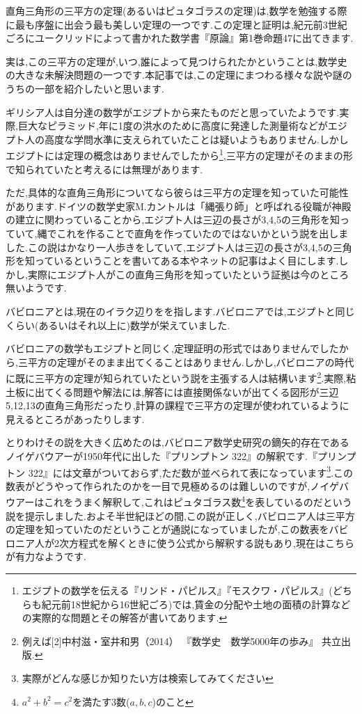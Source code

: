 \documentclass[./main]{subfiles}
\begin{document}

直角三角形の三平方の定理(あるいはピュタゴラスの定理)は,数学を勉強する際に最も序盤に出会う最も美しい定理の一つです.この定理と証明は,紀元前3世紀ごろにユークリッドによって書かれた数学書『原論』第1巻命題47に出てきます.

実は,この三平方の定理が,いつ,誰によって見つけられたかということは,数学史の大きな未解決問題の一つです.本記事では,この定理にまつわる様々な説や謎のうちの一部を紹介したいと思います.

ギリシア人は自分達の数学がエジプトから来たものだと思っていたようです.実際,巨大なピラミッド,年に1度の洪水のために高度に発達した測量術などがエジプト人の高度な学問水準に支えられていたことは疑いようもありません.しかしエジプトには定理の概念はありませんでしたから\footnote{エジプトの数学を伝える『リンド・パピルス』『モスクワ・パピルス』(どちらも紀元前18世紀から16世紀ごろ)では,賃金の分配や土地の面積の計算などの実際的な問題とその解答が書いてあります.},三平方の定理がそのままの形で知られていたと考えるには無理があります.

ただ,具体的な直角三角形についてなら彼らは三平方の定理を知っていた可能性があります.ドイツの数学史家M.カントルは「縄張り師」と呼ばれる役職が神殿の建立に関わっていることから,エジプト人は三辺の長さが3,4,5の三角形を知っていて,縄でこれを作ることで直角を作っていたのではないかという説を出しました.この説はかなり一人歩きをしていて,エジプト人は三辺の長さが3,4,5の三角形を知っているということを書いてある本やネットの記事はよく目にします.しかし,実際にエジプト人がこの直角三角形を知っていたという証拠は今のところ無いようです.


バビロニアとは,現在のイラク辺りをを指します.バビロニアでは,エジプトと同じくらい(あるいはそれ以上に)数学が栄えていました.

バビロニアの数学もエジプトと同じく,定理証明の形式ではありませんでしたから,三平方の定理がそのまま出てくることはありません.しかし,バビロニアの時代に既に三平方の定理が知られていたという説を主張する人は結構います\footnote{例えば[2]中村滋・室井和男（2014） 『数学史　数学5000年の歩み』 共立出版.}.実際,粘土板に出てくる問題や解法には,解答には直接関係ないが出てくる図形が三辺5,12,13の直角三角形だったり,計算の課程で三平方の定理が使われているように見えるところがあったりします.

とりわけその説を大きく広めたのは,バビロニア数学史研究の鏑矢的存在であるノイゲバウアーが1950年代に出した『プリンプトン 322』の解釈です.『プリンプトン 322』には文章がついておらず,ただ数が並べられて表になっています\footnote{実際がどんな感じか知りたい方は検索してみてください}.この数表がどうやって作られたのかを一目で見極めるのは難しいのですが,ノイゲバウアーはこれをうまく解釈して,これはピュタゴラス数\footnote{$a^2 + b^2 = c^2$を満たす3数($a,b,c$)のこと}を表しているのだという説を提示しました.およそ半世紀ほどの間,この説が正しく,バビロニア人は三平方の定理を知っていたのだということが通説になっていましたが,この数表をバビロニア人が2次方程式を解くときに使う公式から解釈する説もあり,現在はこちらが有力なようです.
\end{document}
